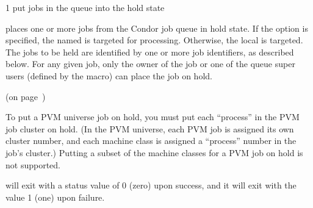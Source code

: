 \begin{ManPage}{\label{man-condor-hold}}{1}
{put jobs in the queue into the hold state}
\Synopsis {}
\ToolArgsBase
\ToolLocate 
\ToolJobs

\ToolArgsBase
\ToolLocate 
\ToolAll


\Description

 places one or more jobs from the Condor job queue in hold state.
If the  option is specified, the named  is targeted
for processing.  
Otherwise, the local  is targeted.
The jobs to be held are identified by one or more job identifiers, as
described below.
For any given job, only the owner of the job or one of the queue super users
(defined by the  macro) can place the job on hold.

\begin{Options}

	\ToolArgsBaseDesc
	\ToolLocateDesc

\end{Options}

\SeeAlso
{} (on page~\pageref{man-condor-release})

\GenRem

To put a PVM universe job on hold, you must put each ``process'' in
the PVM job cluster on hold.  (In the PVM universe, each PVM job is
assigned its own cluster number, and each machine class is assigned a
``process'' number in the job's cluster.)  Putting a subset of the
machine classes for a PVM job on hold is not supported.

\ExitStatus

 will exit with a status value of 0 (zero) upon success,
and it will exit with the value 1 (one) upon failure.

\end{ManPage}
